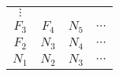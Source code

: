 \begin{center}
	\begin{tabular}{ c c c c }
		$\vdots$ & & & \\
		{\color{red}$F_3$} & {\color{red}$F_4$} & $N_5$ & $\cdots$ \\ 
		{\color{red}$F_2$} & $N_3$ & $N_4$ & $\cdots$ \\
		$N_1$ & $N_2$ & $N_3$ & $\cdots$
	\end{tabular}
\end{center}